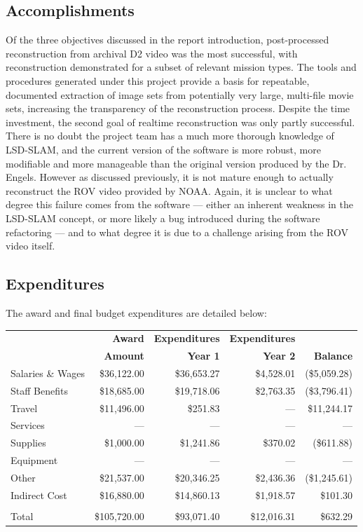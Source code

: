 \documentclass[letterpaper,12pt]{article}
\begin{document}
\subsection{Accomplishments}

Of the three objectives discussed in the report introduction, post-processed reconstruction from archival D2 video was the most successful, with reconstruction demonstrated for a subset of relevant mission types.   The tools and procedures generated under this project provide a basis for repeatable, documented extraction of image sets from potentially very large, multi-file movie sets, increasing the transparency of the reconstruction process.   Despite the time investment, the second goal of realtime reconstruction was only partly successful.   There is no doubt the project team has a much more thorough knowledge of LSD-SLAM, and the current version of the software is more robust, more modifiable and more manageable than the original version produced by the Dr. Engels.  However as discussed previously, it is not mature enough to actually reconstruct the ROV video provided by NOAA.  Again, it is unclear to what degree this failure comes from the software --- either an inherent weakness in the LSD-SLAM concept, or more likely a bug introduced during the software refactoring --- and to what degree it is due to a challenge arising from the ROV video itself.

\subsection{Expenditures}

The award and final budget expenditures are detailed below:

\begin{tabularx}{0.9\textwidth}{X|rrrr}
    & \textbf{Award} & \textbf{Expenditures} & \textbf{Expenditures} &  \\
    & \textbf{Amount} & \textbf{Year 1} & \textbf{Year 2} & \textbf{Balance} \\
    \hline\hline
    Salaries \& Wages & \$36,122.00 & \$36,653.27 & \$4,528.01 & (\$5,059.28) \\
    Staff Benefits & \$18,685.00 & \$19,718.06 & \$2,763.35 & (\$3,796.41) \\
    Travel & \$11,496.00 & \$251.83 & --- & \$11,244.17 \\
    Services & --- & --- & --- & --- \\
    Supplies & \$1,000.00 & \$1,241.86 & \$370.02 & (\$611.88) \\
    Equipment & --- & --- & --- & --- \\
    Other & \$21,537.00 & \$20,346.25 & \$2,436.36 & (\$1,245.61) \\
    Indirect Cost & \$16,880.00 & \$14,860.13 & \$1,918.57 & \$101.30 \\
     \\
    Total & \$105,720.00 & \$93,071.40 & \$12,016.31 & \$632.29 
\end{tabularx}
\end{document}
